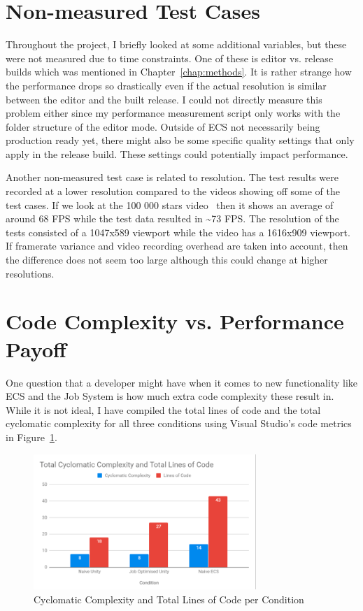 \section{Non-measured Test Cases}\label{sec:unrecordedcases}
Throughout the project, I briefly looked at some additional variables, but these were not measured due to time constraints. One of these is editor vs. release builds which was mentioned in Chapter~\ref{chap:methods}. It is rather strange how the performance drops so drastically even if the actual resolution is similar between the editor and the built release. I could not directly measure this problem either since my performance measurement script only works with the folder structure of the editor mode. Outside of ECS not necessarily being production ready yet, there might also be some specific quality settings that only apply in the release build. These settings could potentially impact performance.

Another non-measured test case is related to resolution. The test results were recorded at a lower resolution compared to the videos showing off some of the test cases. If we look at the 100 000 stars video~\cite{naiveECSVideo100k} then it shows an average of around 68 FPS while the test data resulted in \textasciitilde73 FPS. The resolution of the tests consisted of a 1047x589 viewport while the video has a 1616x909 viewport. If framerate variance and video recording overhead are taken into account, then the difference does not seem too large although this could change at higher resolutions. 
   
\section{Code Complexity vs. Performance Payoff}
One question that a developer might have when it comes to new functionality like ECS and the Job System is how much extra code complexity these result in. While it is not ideal, I have compiled the total lines of code and the total cyclomatic complexity for all three conditions using Visual Studio's code metrics in Figure~\ref{fig:cycloLines}.

\begin{figure}[tbph]
    \centering
    \includegraphics[width=0.75\textwidth]{Figures/cycloLines.png}
    \caption[Cyclomatic Complexity and Total Lines of Code per Condition]{Cyclomatic Complexity and Total Lines of Code per Condition}
    \label{fig:cycloLines}
\end{figure}

